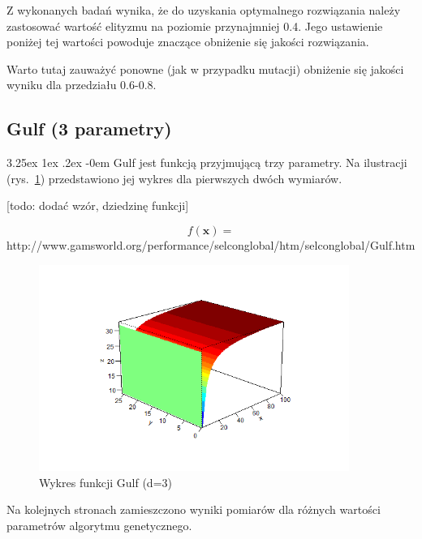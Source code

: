 \documentclass[11pt, a4paper]{article}
\makeatletter
\newcommand{\fbi}{\leavevmode{\parindent=1em\indent}}
\renewcommand\paragraph{\@startsection{paragraph}{5}{\z@}%
  {3.25ex \@plus1ex \@minus.2ex}%
  {-0em}%
  {\normalfont\normalsize\bfseries}}
\makeatother
\begin{document}
\fbi
Z wykonanych badań wynika, że do uzyskania optymalnego rozwiązania należy zastosować wartość elityzmu na poziomie przynajmniej 0.4. Jego ustawienie poniżej tej wartości powoduje znaczące obniżenie się jakości rozwiązania.

\fbi
Warto tutaj zauważyć ponowne (jak w przypadku mutacji) obniżenie się jakości wyniku dla przedziału 0.6-0.8.

\newpage
\subsection{Gulf (3 parametry)}
\paragraph{}
Gulf jest funkcją przyjmującą trzy parametry. Na ilustracji (rys.~\ref{fig:gulf1}) przedstawiono jej wykres dla pierwszych dwóch wymiarów.

[todo: dodać wzór, dziedzinę funkcji]

\begin{equation}\label{eq:gulf}
f(\boldsymbol{x}) = 
\end{equation}
http://www.gamsworld.org/performance/selconglobal/htm/selconglobal/Gulf.htm



\begin{figure}[H]
	\begin{center}
		\includegraphics[width=0.9\textwidth]{./assets/Gulf1.png} %
		\caption{Wykres funkcji Gulf (d=3)}
		\label{fig:gulf1}
	\end{center}
\end{figure}

\fbi
Na kolejnych stronach zamieszczono wyniki pomiarów dla różnych wartości parametrów algorytmu genetycznego.
\end{document}
